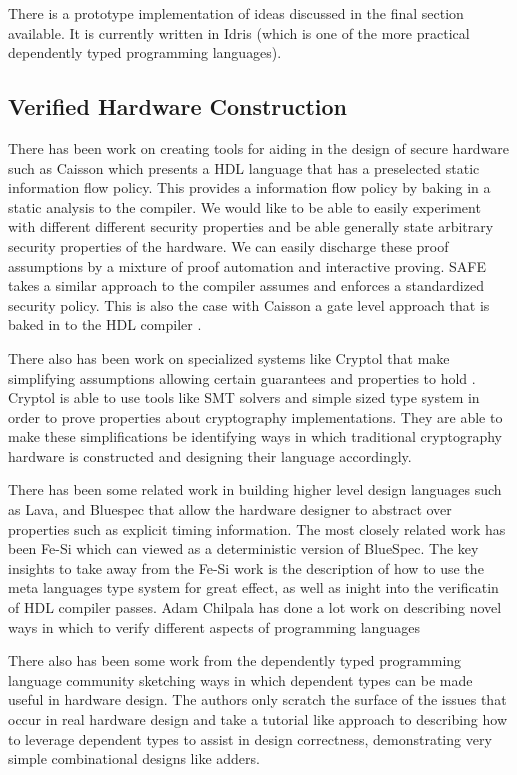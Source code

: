 \documentclass[12pt, titlepage]{article}
\begin{document}
There is a prototype implementation of ideas discussed in the final section available. It is currently
written in Idris (which is one of the more practical dependently typed programming languages).

\subsection{Verified Hardware Construction}

There has been work on creating tools for aiding in the design of secure hardware such as Caisson which presents a HDL 
language that has a preselected static information flow policy. This provides a information flow policy by baking in 
a static analysis to the compiler. We would like to be able to easily experiment with different different security 
properties and be able generally state arbitrary security properties of the hardware. We can easily discharge these
proof assumptions by a mixture of proof automation and interactive proving. SAFE takes a similar approach to the
compiler assumes and enforces a standardized security policy. This is also the case with Caisson a gate level 
approach that is baked in to the HDL compiler \cite{Li:2011:CHD:1993498.1993512}.

There also has been work on specialized systems like Cryptol that make simplifying assumptions allowing certain guarantees
and properties to hold \cite{cryptol2010}. Cryptol is able to use tools like SMT solvers and simple sized type system in
order to prove properties about cryptography implementations. They are able to make these simplifications be identifying 
ways in which traditional cryptography hardware is constructed and designing their language accordingly.

 There has been some related work in building higher level design languages such as Lava, and Bluespec
that allow the hardware designer to abstract over properties such as explicit timing information. The most closely related
work has been Fe-Si \cite{fesi} which can viewed as a deterministic version of BlueSpec. The key insights to take away from
the Fe-Si work is the description of how to use the meta languages type system for great effect, as well as inight into
the verificatin of HDL compiler passes. Adam Chilpala has done a lot work on describing novel ways in which to verify different
aspects of programming languages \cite{Chlipala:2007:CTC:1250734.1250742}\cite{chlipala2011certified}

There also has been some work from the dependently typed programming language community sketching ways in which dependent types
can be made useful in hardware design\cite{Brady_constructingcorrect}. The authors only scratch the surface of the issues that
occur in real hardware design and take a tutorial like approach to describing how to leverage dependent types to assist in 
design correctness, demonstrating very simple combinational designs like adders.
\end{document}
